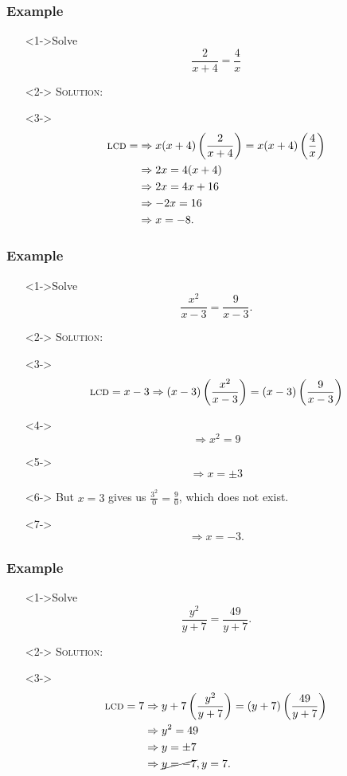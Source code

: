 \documentclass[handout]{beamer}
\begin{document}
\begin{frame}
	\frametitle{Example} 
	\begin{enumerate}
		\item[]<1->Solve 
		\[
			\frac{2}{x+4}=\frac{4}{x} 
		\]
		\item[]<2-> \textsc{Solution:} 
		\item[]<3-> 
		\begin{align*}
			\text{\textsc{lcd}}= & \Rightarrow x(x+4) \left( \frac{2}{x+4}\right)=x(x+4) \left( \frac{4}{x} \right) \\
			& \Rightarrow 2x=4(x+4) \\
			& \Rightarrow 2x=4x+16 \\
			& \Rightarrow -2x=16 \\
			& \Rightarrow x=-8. 
		\end{align*}
	\end{enumerate}
\end{frame}

\begin{frame}
	\frametitle{Example}
	\begin{enumerate}
		\item[]<1->Solve \[ \frac{x^{2}}{x-3}=\frac{9}{x-3}. \]
		\item[]<2-> \textsc{Solution:}
		\item[]<3-> \[ \text{\textsc{lcd}}=x-3 \Rightarrow (x-3) \left( \frac{x^{2}}{x-3} \right)=(x-3) \left( \frac{9}{x-3}\right)\] 
		\item[]<4-> \[\Rightarrow  x^{2}=9 \]
		\item[]<5->\[ \Rightarrow x=\pm 3 \]
		\item[]<6-> But $x=3$ gives us $\frac{3^{2}}{0}=\frac{9}{0}$, which does not exist. 
		\item[]<7-> \[ \Rightarrow x=-3. \] 
	\end{enumerate} 
\end{frame}

\begin{frame}
	\frametitle{Example} 
	\begin{enumerate}
		\item[]<1->Solve 
		\[
			\frac{y^{2}}{y+7}=\frac{49}{y+7}. 
		\]
		\item[]<2-> \textsc{Solution:} 
		\item[]<3-> 
		\begin{align*}
			\text{\textsc{lcd}}=7 & \Rightarrow y+7 \left( \frac{y^{2}}{y+7}\right)=(y+7) \left( \frac{49}{y+7}\right)  \\
			& \Rightarrow y^{2}=49 \\
			& \Rightarrow y= \pm 7 \\
			& \Rightarrow \cancel{y=-7}, y=7. 
		\end{align*}
	\end{enumerate}
\end{frame}
\end{document}
